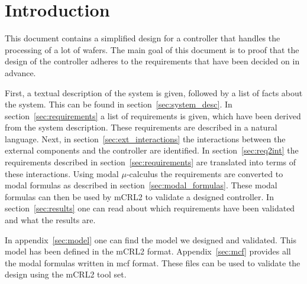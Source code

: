 \section{Introduction}
This document contains a simplified design for a controller that handles the processing of a lot of wafers.
The main goal of this document is to proof that the design of the controller adheres to the requirements that have been decided on in advance.

First, a textual description of the system is given, followed by a list of facts about the system. This can be found in section~\ref{sec:system_desc}.
In section~\ref{sec:requirements} a list of requirements is given, which have been derived from the system description. These requirements are described in a natural language.
Next, in section~\ref{sec:ext_interactions} the interactions between the external components and the controller are identified.
In section~\ref{sec:req2int} the requirements described in section~\ref{sec:requirements} are translated into terms of these interactions.
Using modal $\mu$-calculus the requirements are converted to modal formulas as described in section~\ref{sec:modal_formulas}.
These modal formulas can then be used by mCRL2 to validate a designed controller.
In section~\ref{sec:results} one can read about which requirements have been validated and what the results are.

In appendix~\ref{sec:model} one can find the model we designed and validated.
This model has been defined in the mCRL2 format.
Appendix~\ref{sec:mcf} provides all the modal formulas written in mcf format.
These files can be used to validate the design using the mCRL2 tool set.